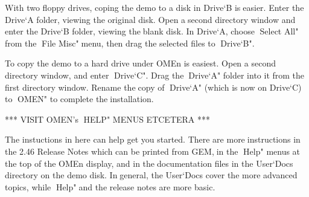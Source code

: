 With two floppy drives, coping the demo to a disk in Drive`B iseasier. Enter the Drive`A folder, viewing the original disk. Open asecond directory window and enter the Drive`B folder, viewing theblank disk. In Drive`A, choose Select All" from the File Misc"menu, then drag the selected files to Drive`B".

To copy the demo to a hard drive under OMEn is easiest.
Open a second directory window, and enter Drive`C". Drag theDrive`A" folder into it from the first directory window. Rename thecopy of Drive`A" (which is now on Drive`C) to OMEN" to complete theinstallation.


*** VISIT OMEN's HELP" MENUS ETCETERA ***

The instuctions in here can help get you started. There are moreinstructions in the 2.46 Release Notes which can be printed from GEM,in the Help" menus at the top of the OMEn display, and in thedocumentation files in the User`Docs directory on the demo disk. Ingeneral, the User`Docs cover the more advanced topics, while Help"and the release notes are more basic.
 